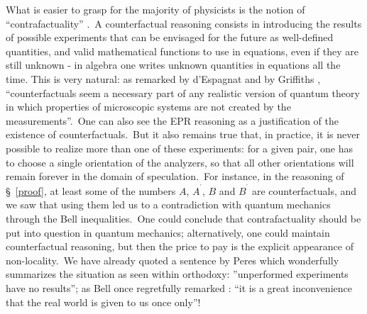 \documentclass[12pt,onecolumn]{article}%
\begin{document}
What is easier to grasp for the majority of physicists is the notion of
``contrafactuality'' \cite{Stapp-3}.\ A counterfactual reasoning consists in
introducing the results of possible experiments that can be envisaged for the
future as well-defined quantities, and valid mathematical functions to use in
equations, even if they are still unknown - in algebra one writes unknown
quantities in equations all the time. This is very natural: as remarked by
d'Espagnat \cite{BD-1} \cite{BD-2} and by Griffiths \cite{Griffiths-5},
``counterfactuals seem a necessary part of any realistic version of quantum
theory in which properties of microscopic systems are not created by the
measurements''.\ One can also see the EPR reasoning as a justification of the
existence of counterfactuals.\ But it also remains true that, in practice, it
is never possible to realize more than one of these experiments: for a given
pair, one has to choose a single orientation of the analyzers, so that all
other orientations will remain forever in the domain of speculation.\ For
instance, in the reasoning of \S \ \ref{proof}, at least some of the numbers
$A$, $A^{^{\prime}}$, $B$ and $B^{^{\prime}}$ are counterfactuals, and we saw
that using them led us to a contradiction with quantum mechanics through the
Bell inequalities.\ One could conclude that contrafactuality should be put
into question in quantum mechanics; alternatively, one could maintain
counterfactual reasoning, but then the price to pay is the explicit appearance
of non-locality.\ We have already quoted a sentence by Peres \cite{Peres}
which wonderfully summarizes the situation as seen within orthodoxy:
''unperformed experiments have no results''; as Bell once regretfully remarked
\cite{Bell-once-only}: ``it is a great inconvenience that the real world is
given to us once only''!
\end{document}
